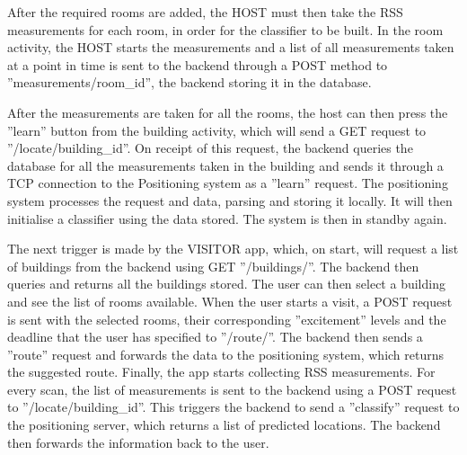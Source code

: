 After the required rooms are added, the HOST must then take the RSS measurements for each room, in order for the classifier to be built. In the room activity, the HOST starts the measurements and a list of all measurements taken at a point in time is sent to the backend through a POST method to ”measurements/room\_id”, the backend storing it in the database.

After the measurements are taken for all the rooms, the host can then press the ”learn” button from the building activity, which will send a GET request to ”/locate/building\_id”. On receipt of this request, the backend queries the database for all the measurements taken in the building and sends it through a TCP connection to the Positioning system as a ”learn” request. The positioning system processes the request and data, parsing and storing it locally. It will then initialise a classifier using the data stored. The system is then in standby again.

The next trigger is made by the VISITOR app, which, on start, will request a list of buildings from the backend using GET ”/buildings/”. The backend then queries and returns all the buildings stored. The user can then select a building and see the list of rooms available. When the user starts a visit, a POST request is sent with the selected rooms, their corresponding ”excitement” levels and the deadline that the user has specified to ”/route/”. The backend then sends a ”route” request and forwards the data to the positioning system, which returns the suggested route. Finally, the app starts collecting RSS measurements. For every scan, the list of measurements is sent to the backend using a POST request to ”/locate/building\_id”. This triggers the backend to send a ”classify” request to the positioning server, which returns a list of predicted locations. The backend then forwards the information back to the user.

